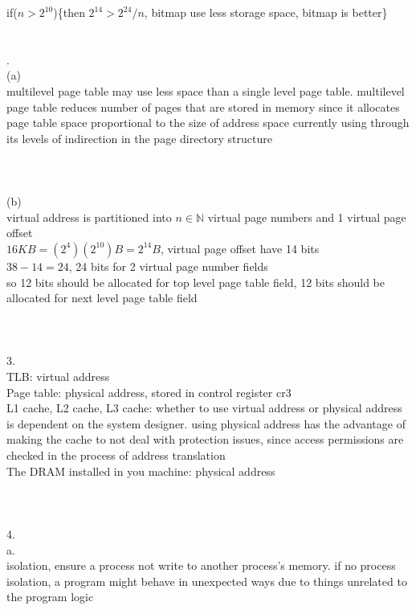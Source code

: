 \documentclass[12pt, border = 4pt, multi]{article} %
\begin{document}
if($n > 2 ^ {10}$)\{then $2 ^ {14} > 2 ^ {24} / n$, bitmap use less storage space, bitmap is better\}\\
\\
\\
\newpage
{}.\\
(a)\\
multilevel page table may use less space than a single level page table. multilevel page table reduces number of pages that are stored in memory since it allocates page table space proportional to the size of address space currently using through its levels of indirection in the page directory structure\\
\\
\\
\\
(b)\\
virtual address is partitioned into $n \in \mathbb{N}$ virtual page numbers and 1 virtual page offset\\
$16KB = (2 ^ 4)(2 ^ {10})B = 2 ^ {14}B$, virtual page offset have 14 bits\\
$38 - 14 = 24$, 24 bits for 2 virtual page number fields\\
so 12 bits should be allocated for top level page table field, 12 bits should be allocated for next level page table field\\
\\
\\
\\
3.\\
TLB: virtual address\\
Page table: physical address, stored in control register cr3\\
L1 cache, L2 cache, L3 cache: whether to use virtual address or physical address is dependent on the system designer. using physical address has the advantage of making the cache to not deal with protection issues, since access permissions are checked in the process of address translation\\
The DRAM installed in you machine: physical address\\
\\
\\
\\
4.\\
a.\\
isolation, ensure a process not write to another process's memory. if no process isolation, a program might behave in unexpected ways due to things unrelated to the program logic\\
\\
\end{document}
